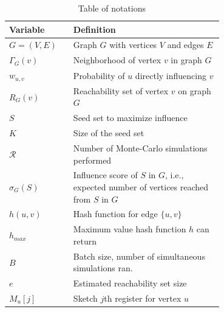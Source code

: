 \documentclass[10pt,journal,compsoc]{IEEEtran}
\begin{document}
\begin{table}[!ht]
    \caption{Table of notations}
    \label{tab:notation}
    \centering
    \begin{tabular}{|l|p{0.7\linewidth}|}
        \hline
        Variable & Definition  \\
        \hline
        $G = (V,E)$     & Graph $G$ with vertices $V$ and edges $E$ \\
        $\Gamma_G(v)$   & Neighborhood of vertex $v$ in graph $G$\\
        $w_{u,v}$       & Probability of $u$ directly influencing $v$ \\
        $R_{G}(v)$      & Reachability set of vertex $v$ on graph $G$\\
        \hline\hline
        $S$             & Seed set to maximize influence\\
        $K$             & Size of the seed set\\
        $\mathcal{R}$   & Number of Monte-Carlo simulations performed\\
        $\sigma_{G}(S)$ & Influence score of $S$ in $G$, i.e., expected number of vertices reached from $S$ in $G$\\
\hline\hline
        $h(u,v)$        & Hash function for edge $\{u,v\}$\\
        $h_{max}$       & Maximum value hash function $h$ can return\\
        \hline\hline
        $B$             & Batch size, number of simultaneous simulations ran.\\
        $e$             & Estimated reachability set size\\
        $M_u[j]$        & Sketch $j$th register for vertex $u$\\

\end{tabular}
\end{table}
\end{document}
